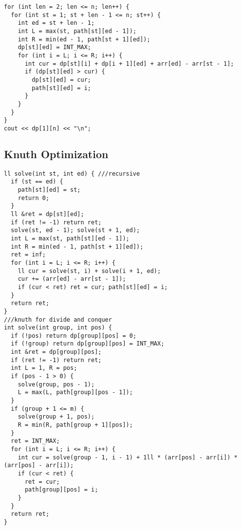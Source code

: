 \documentclass[10pt,a4paper,onesided]{article}
\begin{document}
\begin{multicols*}{3}
\begin{lstlisting}
for (int len = 2; len <= n; len++) {
  for (int st = 1; st + len - 1 <= n; st++) {
    int ed = st + len - 1;
    int L = max(st, path[st][ed - 1]);
    int R = min(ed - 1, path[st + 1][ed]);
    dp[st][ed] = INT_MAX;
    for (int i = L; i <= R; i++) {
      int cur = dp[st][i] + dp[i + 1][ed] + arr[ed] - arr[st - 1];
      if (dp[st][ed] > cur) {
        dp[st][ed] = cur;
        path[st][ed] = i;
      }
    }
  }
}
cout << dp[1][n] << "\n";\end{lstlisting}
\subsection{Knuth Optimization}
\begin{lstlisting}
ll solve(int st, int ed) { ///recursive
  if (st == ed) {
    path[st][ed] = st;
    return 0;
  }
  ll &ret = dp[st][ed];
  if (ret != -1) return ret;
  solve(st, ed - 1); solve(st + 1, ed);
  int L = max(st, path[st][ed - 1]);
  int R = min(ed - 1, path[st + 1][ed]);
  ret = inf;
  for (int i = L; i <= R; i++) {
    ll cur = solve(st, i) + solve(i + 1, ed);
    cur += (arr[ed] - arr[st - 1]);
    if (cur < ret) ret = cur; path[st][ed] = i;
  }
  return ret;
}
///knuth for divide and conquer
int solve(int group, int pos) {
  if (!pos) return dp[group][pos] = 0;
  if (!group) return dp[group][pos] = INT_MAX;
  int &ret = dp[group][pos];
  if (ret != -1) return ret;
  int L = 1, R = pos;
  if (pos - 1 > 0) {
    solve(group, pos - 1);
    L = max(L, path[group][pos - 1]);
  }
  if (group + 1 <= m) {
    solve(group + 1, pos);
    R = min(R, path[group + 1][pos]);
  }
  ret = INT_MAX;
  for (int i = L; i <= R; i++) {
    int cur = solve(group - 1, i - 1) + 1ll * (arr[pos] - arr[i]) * (arr[pos] - arr[i]);
    if (cur < ret) {
      ret = cur;
      path[group][pos] = i;
    }
  }
  return ret;
}
\end{lstlisting}

\end{multicols*}
\end{document}
